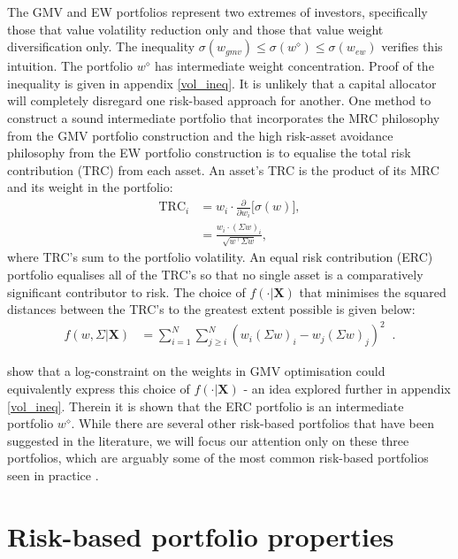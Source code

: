 \documentclass[a4paper,11pt,nocenter,bold,noupper,headcount]{mythesis}
\theoremstyle{plain}
\theoremstyle{definition}
\begin{document}
The GMV and EW portfolios represent two extremes of investors, specifically those that value volatility reduction only and those that value weight diversification only. The inequality $\sigma(w_{gmv}) \leq \sigma(w^\diamond) \leq \sigma(w_{ew})$ verifies this intuition. The portfolio $w^\diamond$ has intermediate weight concentration. Proof of the inequality is given in appendix \ref{vol_ineq}. It is unlikely that a capital allocator will completely disregard one risk-based approach for another. One method to construct a sound intermediate portfolio that incorporates the MRC philosophy from the GMV portfolio construction and the high risk-asset avoidance philosophy from the EW portfolio construction is to equalise the total risk contribution (TRC) from each asset. An asset's TRC is the product of its MRC and its weight in the portfolio:
\begin{align*}
\text{TRC}_i &= w_i \cdot \frac{\partial}{\partial w_i} \Big [ \sigma(w)\Big ], \\
& = \frac{w_i \cdot (\Sigma w)_i}{\sqrt{w^\intercal \Sigma w}},
\end{align*}
where TRC's sum to the portfolio volatility. An equal risk contribution (ERC) portfolio equalises all of the TRC's so that no single asset is a comparatively significant contributor to risk. The choice of $f(\cdot|\textbf{X})$ that minimises the squared distances between the TRC's to the greatest extent possible is given below:
\begin{align}
f(w, \Sigma|\textbf{X}) &= \sum_{i = 1}^N  \sum_{j \geq i}^N(w_i(\Sigma w)_i - w_j(\Sigma w)_j)^2 \;\;  .
\end{align}

\cite{MRT10} show that a log-constraint on the weights in GMV optimisation could equivalently express this choice of $f(\cdot| \textbf{X})$ - an idea explored further in appendix \ref{vol_ineq}. Therein it is shown that the ERC portfolio is an intermediate portfolio $w^\diamond$. While there are several other risk-based portfolios that have been suggested in the literature, we will focus our attention only on these three portfolios, which are arguably some of the most common risk-based portfolios seen in practice \citep{J13}. 

\section{Risk-based portfolio properties}
\end{document}
